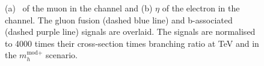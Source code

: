 \begin{figure}[h!]
\begin{center}
\end{center}
\caption{(a) \pT~of the muon in the \mutau channel and (b) $\eta$ of the electron in the \etau channel.
The gluon fusion (dashed blue line)
and b-associated (dashed purple line) signals are overlaid. The signals are normalised to 4000 times their
cross-section times branching ratio at  TeV and  in the $m_{h}^{\text{mod+}}$ scenario.}
\label{fig:mt_muonpt}
\end{figure}
 
